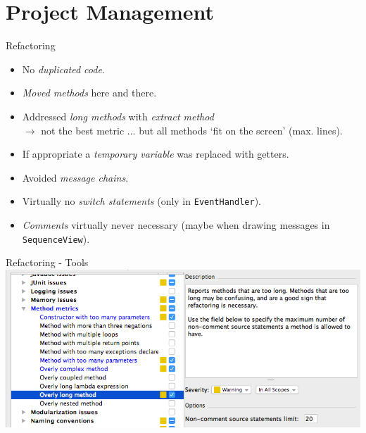 \documentclass[10pt]{beamer}
\begin{document}
\section{Project Management}


\begin{frame}[fragile]{Refactoring}
\begin{itemize}
\item No \textit{duplicated code}.
\item \textit{Moved methods} here and there.
\item Addressed \textit{long methods} with \textit{extract method} \\
$\rightarrow$ not the best metric ... but all methods `fit on the screen' (max.  lines).
\item If appropriate a \textit{temporary variable} was replaced with getters.
\item Avoided \textit{message chains}.
\item Virtually no \textit{switch statements} (only in \texttt{EventHandler}).
\item \textit{Comments} virtually never necessary (maybe when drawing messages in \texttt{SequenceView}).
\end{itemize}
\end{frame}

\begin{frame}[fragile]{Refactoring - Tools}
	\includegraphics[width=1\textwidth]{refactoring}
\end{frame}
\end{document}
